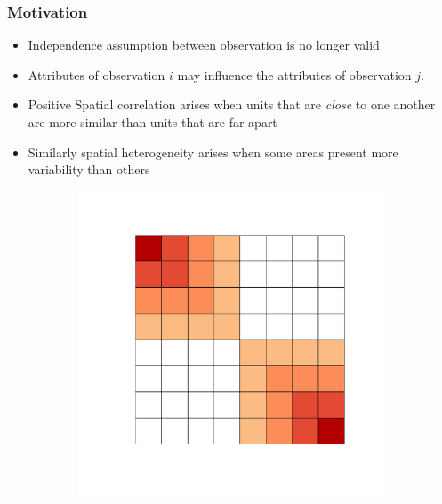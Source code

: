 \documentclass[
  shownotes,
  xcolor={svgnames},
  hyperref={colorlinks,citecolor=DarkBlue,linkcolor=DarkRed,urlcolor=DarkBlue}
  ]{beamer}
\begin{document}
\begin{frame}[fragile]
\frametitle{Motivation}


    \begin{minipage}[t]{0.52\linewidth}
\bigskip
\begin{itemize}
  \small
  \item Independence assumption between observation is no longer valid
  \medskip
  \item Attributes of observation $i$  may influence the attributes of observation $j$.
  \medskip
  \item Positive Spatial correlation arises when units that are {\it close} to one another are more similar than units that are far apart
  \medskip
  \item Similarly spatial heterogeneity arises when some areas present more variability than others
\end{itemize}

    \end{minipage}
    \hfill
    \begin{minipage}[t]{0.43\linewidth}%
       \medskip
        \begin{figure}[H] 
          \begin{subfigure}{0.45\linewidth}
          \includegraphics[scale=.21]{figures/spatial_correlation.pdf}
          \end{subfigure} \\
          

\end{figure}
\end{minipage}
\end{frame}
\end{document}
